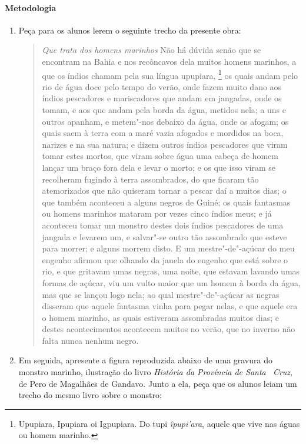 \documentclass[12pt]{extarticle}
\begin{document}
\paragraph{Metodologia}

\begin{enumerate}

\item Peça para os alunos lerem o seguinte trecho da presente obra:

\begin{quote} 
\emph{Que trata dos homens marinhos}
Não há dúvida senão que se encontram na Bahia e nos recôncavos dela 
muitos homens marinhos, a que os índios chamam pela sua língua upupiara,
\footnote{Upupiara, Ipupiara oi Igpupiara. Do tupi \textit{îpupi'ara}, 
aquele que vive nas águas ou homem marinho.} os quais andam pelo rio de 
água doce pelo tempo do verão, onde fazem muito dano aos índios
pescadores e mariscadores que andam em jangadas, onde os tomam, e aos que 
andam pela borda da água, metidos nela; a uns e outros apanham, e metem"-nos 
debaixo da água, onde os afogam; os quais saem à terra com a maré vazia 
afogados e mordidos na boca, narizes e na sua natura; e dizem outros índios pescadores que viram tomar estes mortos, que viram sobre água uma cabeça 
de homem lançar um braço fora dela e levar o morto; e os que isso viram 
se recolheram fugindo à terra assombrados, do que ficaram tão atemorizados 
que não quiseram tornar a pescar daí a muitos dias; o que também aconteceu 
a alguns negros de Guiné; os quais fantasmas ou homens marinhos mataram 
por vezes cinco índios meus; e já aconteceu tomar um monstro destes dois 
índios pescadores de uma jangada e levarem um, e salvar"-se outro tão 
assombrado que esteve para morrer; e alguns morrem disto. E um 
mestre"-de"-açúcar do meu engenho afirmou que olhando da janela do engenho 
que está sobre o rio, e que gritavam umas negras, uma noite, que estavam 
lavando umas formas de açúcar, viu um vulto maior que um homem à borda da 
água, mas que se lançou logo nela; ao qual mestre"-de"-açúcar as negras 
disseram que aquele fantasma vinha para pegar nelas, e que aquele era o 
homem marinho, as quais estiveram assombradas muitos dias; e destes 
acontecimentos acontecem muitos no verão, que no inverno não falta nunca 
nenhum negro.
\end{quote}

\item Em seguida, apresente a figura reproduzida abaixo de uma gravura do 
monstro marinho, ilustração do livro \emph{História da Província de Santa~
Cruz}, de Pero de Magalhães de Gandavo. Junto a ela, peça que os alunos 
leiam um trecho do mesmo livro sobre o monstro:


\end{enumerate}
\end{document}
